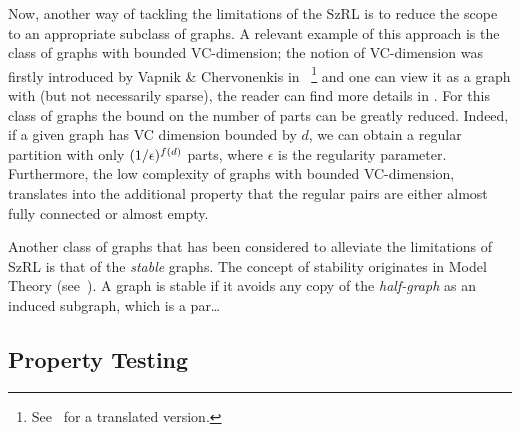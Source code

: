     Now, another way of tackling the limitations of the SzRL is to reduce the scope to an appropriate subclass of graphs.
    A relevant example of this approach is the class of graphs with bounded VC-dimension;
    the notion of VC-dimension was firstly introduced by Vapnik \& Chervonenkis
    in~\cite{the_uniform_convergence_of_frequencies_of_the_appearance_of_events_to_their_probabilities}
    \hspace{-3pt}\footnote{
        See~\cite{on_the_uniform_convergence_of_relative_frequencies_of_events_to_their_probabilities}
        for a translated version.}
    and one can view it as a graph with  (but not necessarily sparse), the reader can find more
    details in .
    For this class of graphs the bound on the number of parts can be greatly reduced.
    Indeed, if a given graph has VC dimension bounded by $d$, we can obtain a regular partition with only
    $( {1}/{\epsilon} )^{f(d)}$ parts, where $\epsilon$ is the regularity parameter.
    Furthermore, the low complexity of graphs with bounded VC-dimension, translates into the additional property that the
    regular pairs are either almost fully connected or almost empty.

    Another class of graphs that has been considered to alleviate the limitations of SzRL is that of the \emph{stable}
    graphs.
    The concept of stability originates in Model Theory
    (see~\cite{classification_theory_and_the_number_of_non_isomorphic_models}).
    A graph is stable if it avoids any copy of the \emph{half-graph} as an induced subgraph, which is a par\dots




    \subsection{Property Testing}



